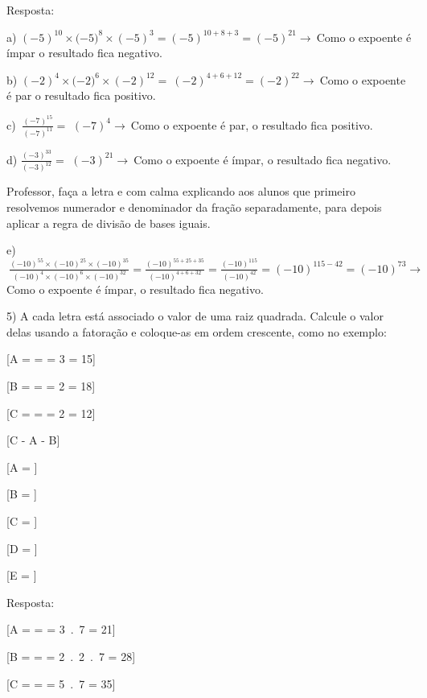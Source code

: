 Resposta:

a)
\({( - 5)}^{10} \times ( - {5)}^{8} \times \left( - 5 \right)^{3} = \left( - 5 \right)^{10 + 8 + 3} = \left( - 5 \right)^{21} \rightarrow \ \)Como
o expoente é ímpar o resultado fica negativo.

b)
\({( - 2)}^{4} \times ( - {2)}^{6} \times \left( - 2 \right)^{12} = \ \left( - 2 \right)^{4 + 6 + 12} = \left( - 2 \right)^{22} \rightarrow \ \)Como
o expoente é par o resultado fica positivo.

c) \(\ \frac{{( - 7)}^{15}}{{( - 7)}^{11}} =\)
\({( - 7)}^{4} \rightarrow \ \)Como o expoente é par, o resultado fica
positivo.

d) \(\frac{{( - 3)}^{33}}{{( - 3)}^{12}} =\)
\({( - 3)}^{21} \rightarrow \ \)Como o expoente é ímpar, o resultado
fica negativo.

Professor, faça a letra e com calma explicando aos alunos que primeiro
resolvemos numerador e denominador da fração separadamente, para depois
aplicar a regra de divisão de bases iguais.

e)\(\ \frac{{( - 10)}^{55} \times {( - 10)}^{25} \times {( - 10)}^{35}}{{( - 10)}^{4} \times {( - 10)}^{6} \times {( - 10)}^{32}} = \frac{{( - 10)}^{55 + 25 + 35}}{{( - 10)}^{4 + 6 + 32}} = \frac{{( - 10)}^{115}}{{( - 10)}^{42}} = {( - 10)}^{115 - 42} = {( - 10)}^{73} \rightarrow \ \)Como
o expoente é ímpar, o resultado fica negativo.

5) A cada letra está associado o valor de uma raiz quadrada. Calcule o
valor delas usando a fatoração e coloque-as em ordem crescente, como no
exemplo:

[A =  =  = 3  = 15]

[B =  =  = 2   = 18]

[C =  =  = 2   = 12]

[C - A - B]

[A = ]

[B = ]

[C = ]

[D = ]

[E = ]

Resposta:

[A =  =  = 3\ .\ 7 = 21]

[B =  =  = 2\ .\ 2\ .\ 7 = 28]

[C =  =  = 5\ .\ 7 = 35]

